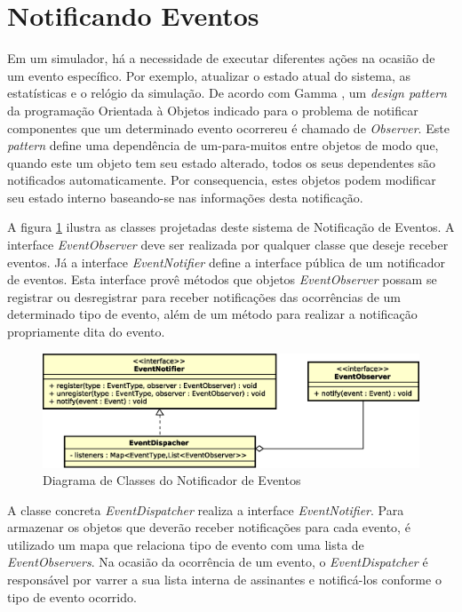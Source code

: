 \section{Notificando Eventos}

Em um simulador, há a necessidade de executar diferentes ações na ocasião de um
evento específico. Por exemplo, atualizar o estado atual do sistema, as
estatísticas e o relógio da simulação. De acordo com Gamma
\cite{Gamma:1995:DPE:186897}, um \textit{design pattern} da programação
Orientada à Objetos indicado para o problema de notificar componentes que um
determinado evento ocorrereu é chamado de \textit{Observer}. Este
\textit{pattern} define uma dependência de um-para-muitos entre objetos de modo
que, quando este um objeto tem seu estado alterado, todos os seus dependentes
são notificados automaticamente. Por consequencia, estes objetos podem modificar
seu estado interno baseando-se nas informações desta notificação.

A figura \ref{fig:diagram:notification} ilustra as classes projetadas deste
sistema de Notificação de Eventos. A interface \textit{EventObserver} deve ser
realizada por qualquer classe que deseje receber eventos. Já a interface
\textit{EventNotifier} define a interface pública de um notificador de eventos.
Esta interface provê métodos que objetos \textit{EventObserver} possam se
registrar ou desregistrar para receber notificações das ocorrências de um
determinado tipo de evento, além de um método para realizar a notificação
propriamente dita do evento.

\begin{figure}[htb!]
  \centering
  \includegraphics[scale=0.6]{img/notification.eps}
  \caption{Diagrama de Classes do Notificador de Eventos}
\label{fig:diagram:notification}
\end{figure}

A classe concreta \textit{EventDispatcher} realiza a interface
\textit{EventNotifier}. Para armazenar os objetos que deverão receber
notificações para cada evento, é utilizado um mapa que relaciona tipo de evento
com uma lista de \textit{EventObservers}. Na ocasião da ocorrência de um evento,
o \textit{EventDispatcher} é responsável por varrer a sua lista interna de
assinantes e notificá-los conforme o tipo de evento ocorrido.

